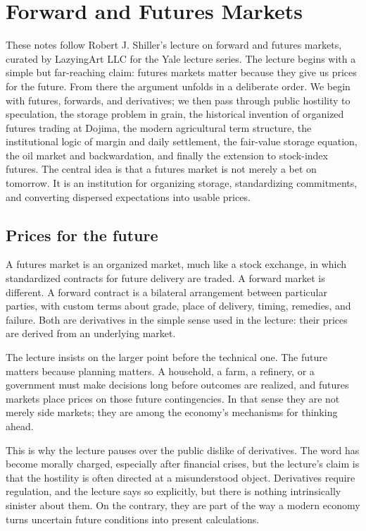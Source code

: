 \chapter{Forward and Futures Markets}

These notes follow Robert J. Shiller's lecture on forward and futures markets, curated by LazyingArt LLC for the Yale lecture series. The lecture begins with a simple but far-reaching claim: futures markets matter because they give us prices for the future. From there the argument unfolds in a deliberate order. We begin with futures, forwards, and derivatives; we then pass through public hostility to speculation, the storage problem in grain, the historical invention of organized futures trading at Dojima, the modern agricultural term structure, the institutional logic of margin and daily settlement, the fair-value storage equation, the oil market and backwardation, and finally the extension to stock-index futures. The central idea is that a futures market is not merely a bet on tomorrow. It is an institution for organizing storage, standardizing commitments, and converting dispersed expectations into usable prices.

\section{Prices for the future}

A futures market is an organized market, much like a stock exchange, in which standardized contracts for future delivery are traded. A forward market is different. A forward contract is a bilateral arrangement between particular parties, with custom terms about grade, place of delivery, timing, remedies, and failure. Both are derivatives in the simple sense used in the lecture: their prices are derived from an underlying market.

The lecture insists on the larger point before the technical one. The future matters because planning matters. A household, a farm, a refinery, or a government must make decisions long before outcomes are realized, and futures markets place prices on those future contingencies. In that sense they are not merely side markets; they are among the economy's mechanisms for thinking ahead.

This is why the lecture pauses over the public dislike of derivatives. The word has become morally charged, especially after financial crises, but the lecture's claim is that the hostility is often directed at a misunderstood object. Derivatives require regulation, and the lecture says so explicitly, but there is nothing intrinsically sinister about them. On the contrary, they are part of the way a modern economy turns uncertain future conditions into present calculations.

